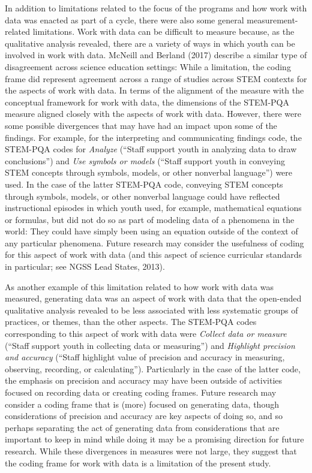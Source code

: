 \documentclass[]{msu-thesis}
\theoremstyle{definition}
\theoremstyle{definition}
\theoremstyle{definition}
\theoremstyle{remark}
\begin{document}
In addition to limitations related to the focus of the programs and how
work with data was enacted as part of a cycle, there were also some
general measurement-related limitations. Work with data can be difficult
to measure because, as the qualitative analysis revealed, there are a
variety of ways in which youth can be involved in work with data.
McNeill and Berland (2017) describe a similar type of disagreement
across science education settings: While a limitation, the coding frame
did represent agreement across a range of studies across STEM contexts
for the aspects of work with data. In terms of the alignment of the
measure with the conceptual framework for work with data, the dimensions
of the STEM-PQA measure aligned closely with the aspects of work with
data. However, there were some possible divergences that may have had an
impact upon some of the findings. For example, for the interpreting and
communicating findings code, the STEM-PQA codes for \emph{Analyze}
(``Staff support youth in analyzing data to draw conclusions'') and
\emph{Use symbols or models} (``Staff support youth in conveying STEM
concepts through symbols, models, or other nonverbal language'') were
used. In the case of the latter STEM-PQA code, conveying STEM concepts
through symbols, models, or other nonverbal language could have
reflected instructional episodes in which youth used, for example,
mathematical equations or formulas, but did not do so as part of
modeling data of a phenomena in the world: They could have simply been
using an equation outside of the context of any particular phenomena.
Future research may consider the usefulness of coding for this aspect of
work with data (and this aspect of science curricular standards in
particular; see NGSS Lead States, 2013).

As another example of this limitation related to how work with data was
measured, generating data was an aspect of work with data that the
open-ended qualitative analysis revealed to be less associated with less
systematic groups of practices, or themes, than the other aspects. The
STEM-PQA codes corresponding to this aspect of work with data were
\emph{Collect data or measure} (``Staff support youth in collecting data
or measuring'') and \emph{Highlight precision and accuracy} (``Staff
highlight value of precision and accuracy in measuring, observing,
recording, or calculating''). Particularly in the case of the latter
code, the emphasis on precision and accuracy may have been outside of
activities focused on recording data or creating coding frames. Future
research may consider a coding frame that is (more) focused on
generating data, though considerations of precision and accuracy are key
aspects of doing so, and so perhaps separating the act of generating
data from considerations that are important to keep in mind while doing
it may be a promising direction for future research. While these
divergences in measures were not large, they suggest that the coding
frame for work with data is a limitation of the present study.
\end{document}
